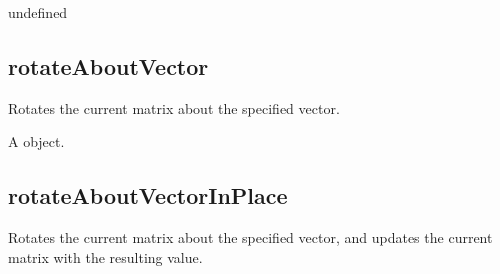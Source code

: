\documentclass[letterpaper,12pt,english,openany,oneside]{sphinxmanual}
\begin{document}
\label{\detokenize{JS_3D_API:syntax-46}}

\begin{sphinxVerbatim}[commandchars=\\\{\}]
\end{sphinxVerbatim}
\label{\detokenize{JS_3D_API:parameters-33}}

\label{\detokenize{JS_3D_API:section-52}}\label{\detokenize{JS_3D_API:returns-47}}

undefined


\subsection{rotateAboutVector}
\label{\detokenize{JS_3D_API:rotateaboutvector}}
Rotates the current matrix about the specified vector.

\label{\detokenize{JS_3D_API:syntax-47}}

\begin{sphinxVerbatim}[commandchars=\\\{\}]
 
\end{sphinxVerbatim}
\label{\detokenize{JS_3D_API:parameters-34}}

\label{\detokenize{JS_3D_API:section-53}}\label{\detokenize{JS_3D_API:returns-48}}

A  object.


\subsection{rotateAboutVectorInPlace}
\label{\detokenize{JS_3D_API:rotateaboutvectorinplace}}
Rotates the current matrix about the specified vector, and updates the current matrix with the resulting value.

\label{\detokenize{JS_3D_API:syntax-48}}

\begin{sphinxVerbatim}[commandchars=\\\{\}]
 
\end{sphinxVerbatim}
\label{\detokenize{JS_3D_API:parameters-35}}
\end{document}
